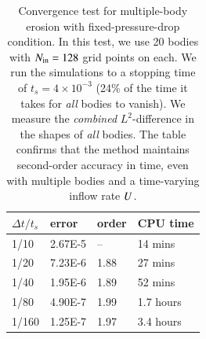 \documentclass[preprint, 10pt]{elsarticle}
\begin{document}
\begin{table}%
\begin{center}
\caption{Convergence test for multiple-body erosion with fixed-pressure-drop condition. In this test, we use 20 bodies with $N_{\mathrm{in}} = 128$ grid points on each. We run the simulations to a stopping time of $t_s = 4 \times 10^{-3}$ (24\% of the time it takes for {\em all} bodies to vanish). We measure the {\em combined} $L^2$-difference in the shapes of {\em all} bodies. The table confirms that the method maintains second-order accuracy in time, even with multiple bodies and a time-varying inflow rate $U$.
}
\vspace{0.3 pc}
\label{convtab}
\begin{tabular}{l l l l}
\hline
\hspace{0.0pc} $\Delta t/t_s$
\hspace{0.5pc} & error 
\hspace{0.5pc} & order
\hspace{0.5pc} & CPU time \\
\hline
%
1/10     	& 2.67E-5  	& --        	& 14 mins  	\\
1/20     	& 7.23E-6  	& 1.88 	& 27 mins  	\\
1/40     	& 1.95E-6  	& 1.89 	& 52 mins  	\\
1/80     	& 4.90E-7  	& 1.99 	& 1.7 hours	\\
1/160     	& 1.25E-7  	& 1.97  	& 3.4 hours	\\
%
\hline
\end{tabular}
\end{center}
\end{table}
\end{document}
